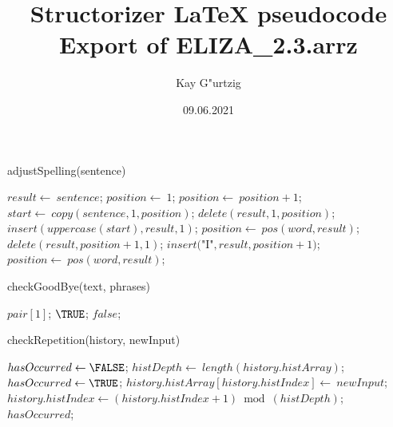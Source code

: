 \documentclass[a4paper,10pt]{article}
\title{Structorizer LaTeX pseudocode Export of ELIZA\_2.3.arrz}
\author{Kay G"urtzig}
\date{09.06.2021}
\begin{document}
\begin{algorithm}
\caption{adjustSpelling(sentence)}
\begin{algorithmic}[5]

\STATE {}
  \STATE \(result\gets\ sentence\);
  \STATE \(position\gets\ 1\);
    \STATE \(position\gets\ position+1\);
  \ENDWHILE
    \STATE \(start\gets\ copy(sentence,1,position)\);
    \STATE \(delete(result,1,position)\);
    \STATE \(insert(uppercase(start),result,1)\);
  \ENDIF
    \STATE \(position\gets\ pos(word,result)\);
      \STATE \(delete(result,position+1,1)\);
      \STATE \(insert(\)"{}I"{}\(,result,position+1)\);
      \STATE \(position\gets\ pos(word,result)\);
    \ENDWHILE
  \ENDFOR

\end{algorithmic}
\end{algorithm}


\begin{algorithm}
\caption{checkGoodBye(text, phrases)}
\begin{algorithmic}[5]

\STATE {}
\STATE {}
\STATE {}
\STATE {}
      \PRINT\(pair[1]\);
      \RETURN\(\TRUE\);
    \ENDIF
  \ENDFOR
  \RETURN\(false\);

\end{algorithmic}
\end{algorithm}


\begin{algorithm}
\caption{checkRepetition(history, newInput)}
\begin{algorithmic}[5]

\STATE {}
\STATE {}
  \STATE \(hasOccurred\gets\FALSE\);
    \STATE \(histDepth\gets\ length(history.histArray)\);
        \STATE \(hasOccurred\gets\TRUE\);
      \ENDIF
    \ENDFOR
    \STATE \(history.histArray[history.histIndex]\gets\ newInput\);
    \STATE \(history.histIndex\gets(history.histIndex+1)\bmod(histDepth)\);
  \ENDIF
  \RETURN\(hasOccurred\);

\end{algorithmic}
\end{algorithm}
\end{document}
